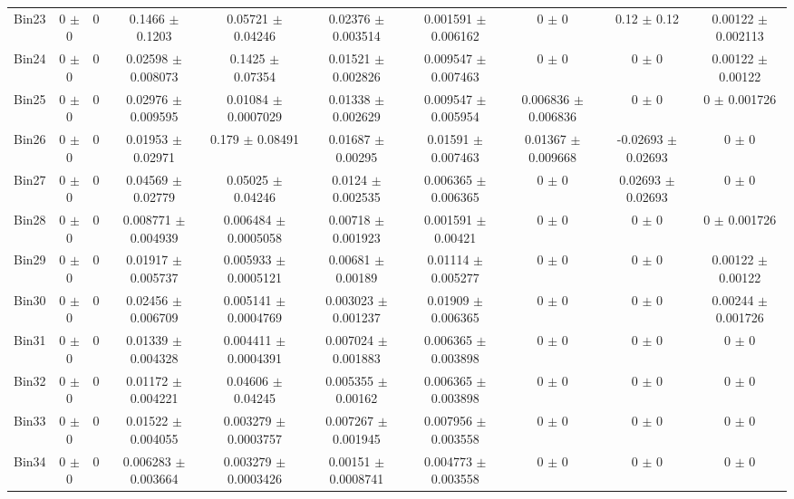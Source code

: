 \begin{tabular}{@{\extracolsep{4pt}}lccccccccc@{}}
     Bin23 & 0 $\pm$ 0 & 0 & 0.1466 $\pm$ 0.1203 & 0.05721 $\pm$ 0.04246 & 0.02376 $\pm$ 0.003514 & 0.001591 $\pm$ 0.006162 & 0 $\pm$ 0 & 0.12 $\pm$ 0.12 & 0.00122 $\pm$ 0.002113 \\ 
     Bin24 & 0 $\pm$ 0 & 0 & 0.02598 $\pm$ 0.008073 & 0.1425 $\pm$ 0.07354 & 0.01521 $\pm$ 0.002826 & 0.009547 $\pm$ 0.007463 & 0 $\pm$ 0 & 0 $\pm$ 0 & 0.00122 $\pm$ 0.00122 \\ 
     Bin25 & 0 $\pm$ 0 & 0 & 0.02976 $\pm$ 0.009595 & 0.01084 $\pm$ 0.0007029 & 0.01338 $\pm$ 0.002629 & 0.009547 $\pm$ 0.005954 & 0.006836 $\pm$ 0.006836 & 0 $\pm$ 0 & 0 $\pm$ 0.001726 \\ 
     Bin26 & 0 $\pm$ 0 & 0 & 0.01953 $\pm$ 0.02971 & 0.179 $\pm$ 0.08491 & 0.01687 $\pm$ 0.00295 & 0.01591 $\pm$ 0.007463 & 0.01367 $\pm$ 0.009668 & -0.02693 $\pm$ 0.02693 & 0 $\pm$ 0 \\ 
     Bin27 & 0 $\pm$ 0 & 0 & 0.04569 $\pm$ 0.02779 & 0.05025 $\pm$ 0.04246 & 0.0124 $\pm$ 0.002535 & 0.006365 $\pm$ 0.006365 & 0 $\pm$ 0 & 0.02693 $\pm$ 0.02693 & 0 $\pm$ 0 \\ 
     Bin28 & 0 $\pm$ 0 & 0 & 0.008771 $\pm$ 0.004939 & 0.006484 $\pm$ 0.0005058 & 0.00718 $\pm$ 0.001923 & 0.001591 $\pm$ 0.00421 & 0 $\pm$ 0 & 0 $\pm$ 0 & 0 $\pm$ 0.001726 \\ 
     Bin29 & 0 $\pm$ 0 & 0 & 0.01917 $\pm$ 0.005737 & 0.005933 $\pm$ 0.0005121 & 0.00681 $\pm$ 0.00189 & 0.01114 $\pm$ 0.005277 & 0 $\pm$ 0 & 0 $\pm$ 0 & 0.00122 $\pm$ 0.00122 \\ 
     Bin30 & 0 $\pm$ 0 & 0 & 0.02456 $\pm$ 0.006709 & 0.005141 $\pm$ 0.0004769 & 0.003023 $\pm$ 0.001237 & 0.01909 $\pm$ 0.006365 & 0 $\pm$ 0 & 0 $\pm$ 0 & 0.00244 $\pm$ 0.001726 \\ 
     Bin31 & 0 $\pm$ 0 & 0 & 0.01339 $\pm$ 0.004328 & 0.004411 $\pm$ 0.0004391 & 0.007024 $\pm$ 0.001883 & 0.006365 $\pm$ 0.003898 & 0 $\pm$ 0 & 0 $\pm$ 0 & 0 $\pm$ 0 \\ 
     Bin32 & 0 $\pm$ 0 & 0 & 0.01172 $\pm$ 0.004221 & 0.04606 $\pm$ 0.04245 & 0.005355 $\pm$ 0.00162 & 0.006365 $\pm$ 0.003898 & 0 $\pm$ 0 & 0 $\pm$ 0 & 0 $\pm$ 0 \\ 
     Bin33 & 0 $\pm$ 0 & 0 & 0.01522 $\pm$ 0.004055 & 0.003279 $\pm$ 0.0003757 & 0.007267 $\pm$ 0.001945 & 0.007956 $\pm$ 0.003558 & 0 $\pm$ 0 & 0 $\pm$ 0 & 0 $\pm$ 0 \\ 
     Bin34 & 0 $\pm$ 0 & 0 & 0.006283 $\pm$ 0.003664 & 0.003279 $\pm$ 0.0003426 & 0.00151 $\pm$ 0.0008741 & 0.004773 $\pm$ 0.003558 & 0 $\pm$ 0 & 0 $\pm$ 0 & 0 $\pm$ 0 \\ 

\end{tabular}
